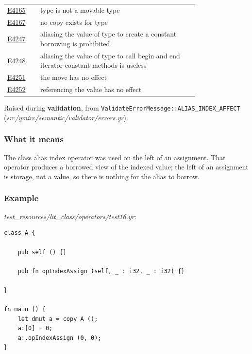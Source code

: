 \begin{longtable}{@{}l p{0.78\linewidth} r@{}}
\hyperref[sec:codes:e4165]{E4165} & type \errhole{} is not a movable type & \pageref{sec:codes:e4165}\\
\hyperref[sec:codes:e4167]{E4167} & no copy exists for type \errhole{} & \pageref{sec:codes:e4167}\\
\hyperref[sec:codes:e4247]{E4247} & aliasing the value of type \errhole{} to create a constant borrowing is prohibited & \pageref{sec:codes:e4247}\\
\hyperref[sec:codes:e4248]{E4248} & aliasing the value of type \errhole{} to call begin and end iterator constant methods is useless & \pageref{sec:codes:e4248}\\
\hyperref[sec:codes:e4251]{E4251} & the move has no effect & \pageref{sec:codes:e4251}\\
\hyperref[sec:codes:e4252]{E4252} & referencing the value has no effect & \pageref{sec:codes:e4252}\\
\bottomrule
\end{longtable}

\errorcode{E4002}{class alias operator :[ is prohibited on the left operand of an affectation}
\label{sec:codes:e4002}

Raised during \textbf{validation}, from \texttt{ValidateErrorMessage::\allowbreak{}ALIAS\_\allowbreak{}INDEX\_\allowbreak{}AFFECT} (\textit{src/\allowbreak{}ymirc/\allowbreak{}semantic/\allowbreak{}validator/\allowbreak{}errors.yr}).

\subsubsection*{What it means}

The class alias index operator \tokennolst{:[} was used on the left of an assignment. That operator produces a borrowed view of the indexed value; the left of an assignment is storage, not a value, so there is nothing for the alias to borrow.

\subsubsection*{Example}

\textit{test\_\allowbreak{}resources/\allowbreak{}lit\_\allowbreak{}class/\allowbreak{}operators/\allowbreak{}test16.yr}:

\begin{lstlisting}[style=coloredverbatimError]
class A {

    pub self () {}

    pub fn opIndexAssign (self, _ : i32, _ : i32) {}

}

fn main () {
    let dmut a = copy A ();
    a:[0] = 0;    
    a:.opIndexAssign (0, 0);
}
\end{lstlisting}

